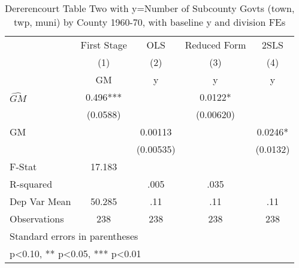 \begin{table}[htbp]\centering
\def\sym#1{\ifmmode^{#1}\else\(^{#1}\)\fi}
\caption{Dererencourt Table Two with y=Number of Subcounty Govts (town, twp, muni) by County 1960-70, with baseline y and division FEs}
\begin{tabular}{l*{4}{c}}
\toprule
                    & First Stage   &         OLS   &Reduced Form   &        2SLS   \\
                    &\multicolumn{1}{c}{(1)}&\multicolumn{1}{c}{(2)}&\multicolumn{1}{c}{(3)}&\multicolumn{1}{c}{(4)}\\
                    &\multicolumn{1}{c}{GM}&\multicolumn{1}{c}{y}&\multicolumn{1}{c}{y}&\multicolumn{1}{c}{y}\\
\midrule
$\hat{GM}$          &       0.496***&               &      0.0122*  &               \\
                    &    (0.0588)   &               &   (0.00620)   &               \\
\addlinespace
GM                  &               &     0.00113   &               &      0.0246*  \\
                    &               &   (0.00535)   &               &    (0.0132)   \\
\midrule
F-Stat              &      17.183   &               &               &               \\
R-squared           &               &        .005   &        .035   &               \\
Dep Var Mean        &      50.285   &         .11   &         .11   &         .11   \\
Observations        &         238   &         238   &         238   &         238   \\
\bottomrule
\multicolumn{5}{l}{\footnotesize Standard errors in parentheses}\\
\multicolumn{5}{l}{\footnotesize * p<0.10, ** p<0.05, *** p<0.01}\\
\end{tabular}
\end{table}
